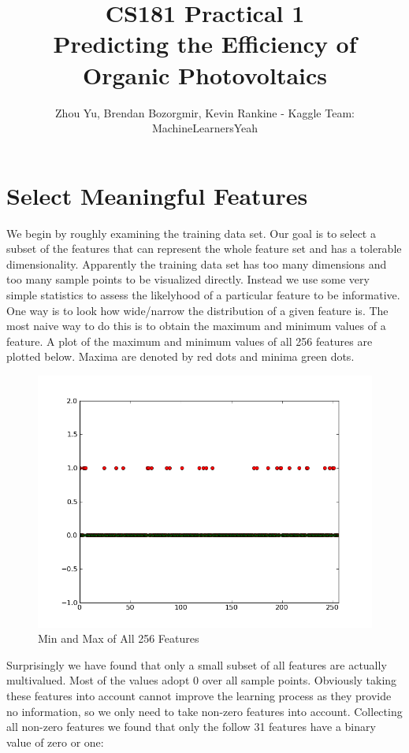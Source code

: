 \documentclass[11pt]{article}
\title{CS181 Practical 1 \\ Predicting the Efficiency of Organic Photovoltaics}
\author{Zhou Yu, Brendan Bozorgmir, Kevin Rankine - Kaggle Team: MachineLearnersYeah}
\begin{document}
\maketitle
\newpage
\tableofcontents
\newpage
\section{Select Meaningful Features}
We begin by roughly examining the training data set. Our goal is to select a subset of the features that can represent the whole feature set and has a tolerable dimensionality. Apparently the training data set has too many dimensions and too many sample points to be visualized directly. Instead we use some very simple statistics to assess the likelyhood of a particular feature to be informative. One way is to look how wide/narrow the distribution of a given feature is. The most naive way to do this is to obtain the maximum and minimum values of a feature. A plot of the maximum and minimum values of all 256 features are plotted below. Maxima are denoted by red dots and minima green dots.
\begin{figure}[h!]
\centering
\includegraphics[scale=0.5]{examining_min_and_max.png}
\caption{Min and Max of All 256 Features}
\end{figure}
Surprisingly we have found that only a small subset of all features are actually multivalued. Most of the values adopt 0 over all sample points. Obviously taking these features into account cannot improve the learning process as they provide no information, so we only need to take non-zero features into account. Collecting all non-zero features we found that only the follow 31 features have a binary value of zero or one:
\end{document}
